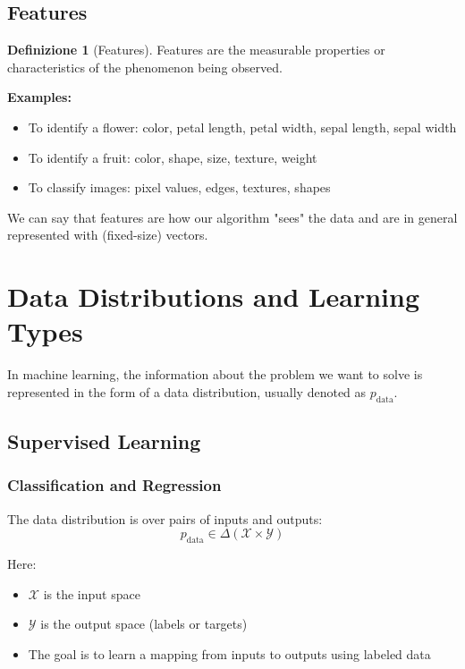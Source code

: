\documentclass[11pt,a4paper]{article}
\theoremstyle{definition}
\newtheorem{definition}{Definizione}[section]
\theoremstyle{plain}
\theoremstyle{remark}
\begin{document}
\subsection{Features}

\begin{definition}[Features]
Features are the measurable properties or characteristics of the phenomenon being observed.
\end{definition}

\textbf{Examples:}
\begin{itemize}
    \item To identify a flower: color, petal length, petal width, sepal length, sepal width
    \item To identify a fruit: color, shape, size, texture, weight
    \item To classify images: pixel values, edges, textures, shapes
\end{itemize}

We can say that features are how our algorithm "sees" the data and are in general represented with (fixed-size) vectors.

\section{Data Distributions and Learning Types}

In machine learning, the information about the problem we want to solve is represented in the form of a data distribution, usually denoted as $p_{\text{data}}$.

\subsection{Supervised Learning}

\subsubsection{Classification and Regression}

The data distribution is over pairs of inputs and outputs:
\[
p_{\text{data}} \in \Delta(\mathcal{X} \times \mathcal{Y})
\]

Here:
\begin{itemize}
    \item $\mathcal{X}$ is the input space
    \item $\mathcal{Y}$ is the output space (labels or targets)
    \item The goal is to learn a mapping from inputs to outputs using labeled data
\end{itemize}
\end{document}
